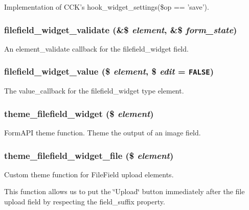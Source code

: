 Implementation of CCK's hook\_\-widget\_\-settings(\$op == 'save'). \hypertarget{filefield__widget_8inc_2db56b57675267528a5cc3cbcc9b9ff2}{
\subsubsection[{filefield\_\-widget\_\-validate}]{\setlength{\rightskip}{0pt plus 5cm}filefield\_\-widget\_\-validate (\&\$ {\em element}, \/  \&\$ {\em form\_\-state})}}
\label{filefield__widget_8inc_2db56b57675267528a5cc3cbcc9b9ff2}


An element\_\-validate callback for the filefield\_\-widget field. \hypertarget{filefield__widget_8inc_3081760b9137ee464d84213644278ae6}{
\subsubsection[{filefield\_\-widget\_\-value}]{\setlength{\rightskip}{0pt plus 5cm}filefield\_\-widget\_\-value (\$ {\em element}, \/  \$ {\em edit} = {\tt FALSE})}}
\label{filefield__widget_8inc_3081760b9137ee464d84213644278ae6}


The value\_\-callback for the filefield\_\-widget type element. \hypertarget{filefield__widget_8inc_b61afc416bab06c537321d636e1cc47b}{
\subsubsection[{theme\_\-filefield\_\-widget}]{\setlength{\rightskip}{0pt plus 5cm}theme\_\-filefield\_\-widget (\$ {\em element})}}
\label{filefield__widget_8inc_b61afc416bab06c537321d636e1cc47b}


FormAPI theme function. Theme the output of an image field. \hypertarget{filefield__widget_8inc_aac3ac93a565ef418ae15d070fbc4625}{
\subsubsection[{theme\_\-filefield\_\-widget\_\-file}]{\setlength{\rightskip}{0pt plus 5cm}theme\_\-filefield\_\-widget\_\-file (\$ {\em element})}}
\label{filefield__widget_8inc_aac3ac93a565ef418ae15d070fbc4625}


Custom theme function for FileField upload elements.

This function allows us to put the \char`\"{}Upload\char`\"{} button immediately after the file upload field by respecting the field\_\-suffix property. 